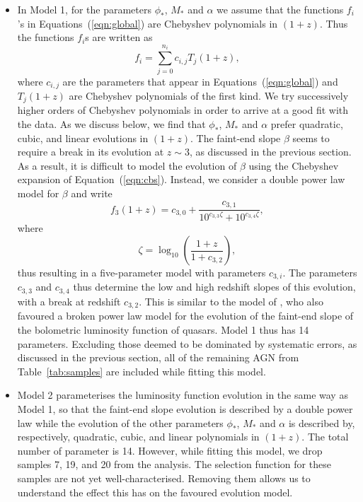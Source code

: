 \documentclass[fleqn,usenatbib]{mnras}
\begin{document}
\begin{itemize}

\item In Model 1, for the parameters $\phi_*$, $M_*$ and $\alpha$ we
  assume that the functions $f_i$'s in Equations~(\ref{eqn:global})
  are Chebyshev polynomials in $(1+z)$.  Thus the functions $f_i$s are
  written as
  \begin{equation}
    f_i=\sum_{j=0}^{n_i}c_{i,j}T_j(1+z),
    \label{eqn:cbs}
  \end{equation}
  where $c_{i,j}$ are the parameters that appear in
  Equations~(\ref{eqn:global}) and $T_j(1+z)$ are Chebyshev
  polynomials of the first kind.  We try successively higher orders of
  Chebyshev polynomials in order to arrive at a good fit with the
  data.  As we discuss below, we find that $\phi_*$, $M_*$ and
  $\alpha$ prefer quadratic, cubic, and linear evolutions in $(1+z)$.
  The faint-end slope $\beta$ seems to require a break in its
  evolution at $z\sim 3$, as discussed in the previous section.  As a
  result, it is difficult to model the evolution of $\beta$ using the
  Chebyshev expansion of Equation~(\ref{eqn:cbs}).  Instead, we
  consider a double power law model for $\beta$ and write
  \begin{equation}
    f_3(1+z)=c_{3,0}+\frac{c_{3,1}}{10^{c_{3,3}\zeta}+10^{c_{3,4}\zeta}},
    \label{eqn:beta}
  \end{equation}
  where
  \begin{equation}
    \zeta = \log_{10}\left(\frac{1+z}{1+c_{3,2}}\right),
  \end{equation}
  thus resulting in a five-parameter model with parameters $c_{3,i}$.
  The parameters $c_{3,3}$ and $c_{3,4}$ thus determine the low and
  high redshift slopes of this evolution, with a break at redshift
  $c_{3,2}$.  This is similar to the model of
  \citet{2007ApJ...654..731H}, who also favoured a broken power law
  model for the evolution of the faint-end slope of the bolometric
  luminosity function of quasars.  Model 1 thus has 14 parameters.
  Excluding those deemed to be dominated by systematic errors, as
  discussed in the previous section, all of the remaining AGN from
  Table~\ref{tab:samples} are included while fitting this model.

\item Model 2 parameterises the luminosity function evolution in the
  same way as Model 1, so that the faint-end slope evolution is
  described by a double power law while the evolution of the other
  parameters $\phi_*$, $M_*$ and $\alpha$ is described by,
  respectively, quadratic, cubic, and linear polynomials in $(1+z)$.
  The total number of parameter is 14.  However, while fitting this
  model, we drop samples 7, 19, and 20 from the analysis.  The
  selection function for these samples are not yet well-characterised.
  Removing them allows us to understand the effect this has on the
  favoured evolution model.


\end{itemize}
\end{document}
